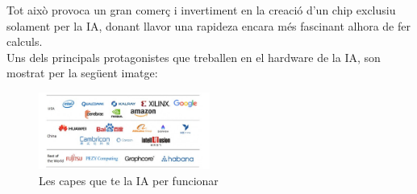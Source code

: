 Tot això provoca un gran comerç i invertiment en la creació d'un chip exclusiu solament per la IA, donant llavor una rapideza encara més fascinant alhora de fer calculs.\\

Uns dels principals  protagonistes que treballen en el hardware de la IA, son mostrat per la següent imatge:
\begin{figure}[h!]
    \centering
    \includegraphics[width=0.5\textwidth]{./figures/Empreses.png}
    \caption{Les capes que te la IA per funcionar}
\end{figure}

